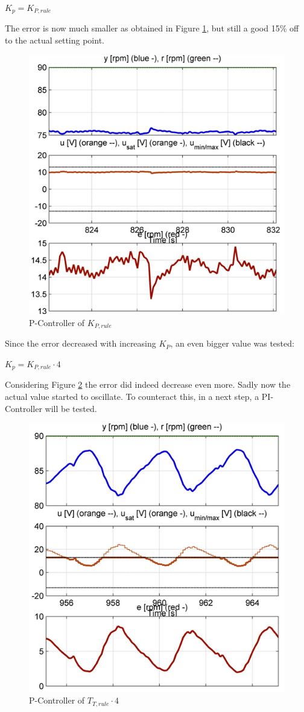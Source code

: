 \begin{center}
{$K_{p}= K_{P,rule}$}
\end{center}

The error is now much smaller as obtained in Figure \ref{fig:p_controller1}, but still a good 15\% off to the actual setting point.

\begin{figure}[H]
\begin{center}
\includegraphics[width=0.5\linewidth]{images/general/P/p_controller1}
\end{center}
\caption{P-Controller of $ K_{P,rule}$}
\label{fig:p_controller1}
\end{figure}

Since the error decreased with increasing $K_P$, an even bigger value was tested:

\begin{center}
{$K_{p}= K_{P,rule}\cdot4$}
\end{center}

Considering Figure \ref{fig:p_controller4} the error did indeed decrease even more. Sadly now the actual value started to oscillate. To counteract this, in a next step, a PI-Controller will be tested.

\begin{figure}[H]
\begin{center}
\includegraphics[width=0.5\linewidth]{images/general/P/p_controller4}
\end{center}
\caption{P-Controller of $ T_{T,rule}\cdot{4}$}
\label{fig:p_controller4}
\end{figure}
\clearpage


